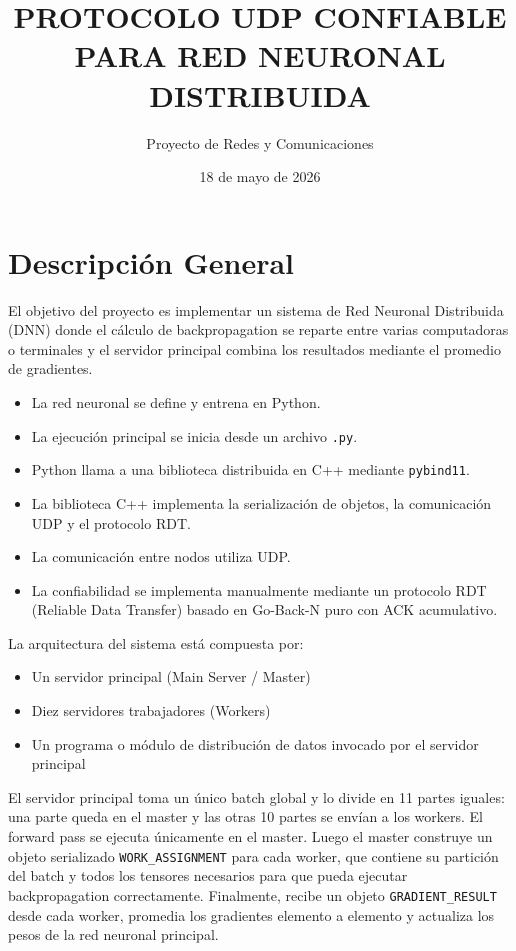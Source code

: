\documentclass[12pt]{article}
\title{PROTOCOLO UDP CONFIABLE PARA RED NEURONAL DISTRIBUIDA}
\author{Proyecto de Redes y Comunicaciones}
\date{18 de mayo de 2026}
\begin{document}
\maketitle

\tableofcontents
\newpage

\section{Descripción General}

El objetivo del proyecto es implementar un sistema de Red Neuronal Distribuida (DNN) donde el cálculo de backpropagation se reparte entre varias computadoras o terminales y el servidor principal combina los resultados mediante el promedio de gradientes.

\begin{itemize}
\item La red neuronal se define y entrena en Python.
\item La ejecución principal se inicia desde un archivo \texttt{.py}.
\item Python llama a una biblioteca distribuida en C++ mediante \texttt{pybind11}.
\item La biblioteca C++ implementa la serialización de objetos, la comunicación UDP y el protocolo RDT.
\item La comunicación entre nodos utiliza UDP.
\item La confiabilidad se implementa manualmente mediante un protocolo RDT (Reliable Data Transfer) basado en Go-Back-N puro con ACK acumulativo.
\end{itemize}

La arquitectura del sistema está compuesta por:

\begin{itemize}
\item Un servidor principal (Main Server / Master)
\item Diez servidores trabajadores (Workers)
\item Un programa o módulo de distribución de datos invocado por el servidor principal
\end{itemize}

El servidor principal toma un único batch global y lo divide en 11 partes iguales: una parte queda en el master y las otras 10 partes se envían a los workers. El forward pass se ejecuta únicamente en el master. Luego el master construye un objeto serializado \texttt{WORK\_ASSIGNMENT} para cada worker, que contiene su partición del batch y todos los tensores necesarios para que pueda ejecutar backpropagation correctamente. Finalmente, recibe un objeto \texttt{GRADIENT\_RESULT} desde cada worker, promedia los gradientes elemento a elemento y actualiza los pesos de la red neuronal principal.
\end{document}
